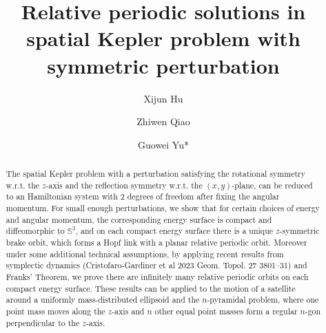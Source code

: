 \documentclass[11pt]{amsart}
\title[relative periodic solution in perturbed Kepler problem]{Relative periodic solutions in spatial Kepler problem with symmetric perturbation}
\author{Xijun Hu}
\author{Zhiwen Qiao}
\author{Guowei Yu*}
\newcommand{\red}[1]{\color{red}#1\color{black}}
\begin{document}
\begin{abstract}

The spatial Kepler problem with a perturbation satisfying the rotational symmetry w.r.t. the $z$-axis and the reflection symmetry w.r.t. the $(x, y)$-plane, can be reduced to an Hamiltonian system with 2 degrees of freedom after fixing the angular momentum. For small enough perturbations, we show that for certain choices of energy and angular momentum, the corresponding energy surface is compact and diffeomorphic to $\mathbb{S}^3$, and on each compact energy surface there is a unique $z$-symmetric brake orbit, which forms a Hopf link with a planar relative periodic orbit. Moreover under some additional technical assumptions, by applying recent results from symplectic dynamics (Cristofaro-Gardiner et al 2023 Geom. Topol. 27 3801–31) and Franks' Theorem, we prove there are infinitely many relative periodic orbits on each compact energy surface. These results can be applied to the motion of a satellite around a uniformly mass-distributed ellipsoid and the $n$-pyramidal problem, where one point mass moves along the $z$-axis and $n$ other equal point masses form a regular $n$-gon perpendicular to the $z$-axis.


\end{abstract}

\maketitle
\end{document}
